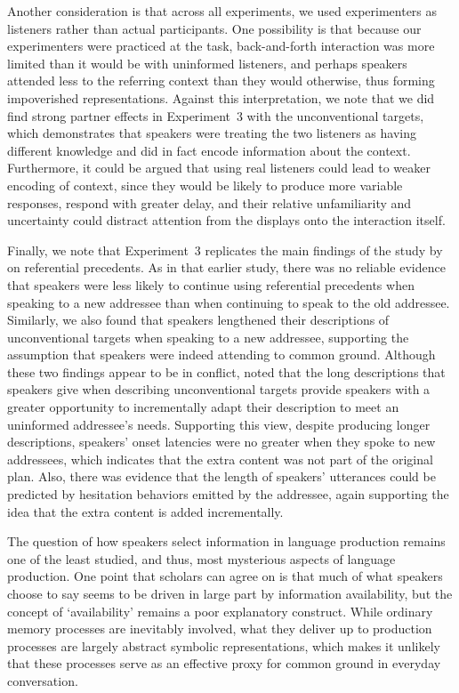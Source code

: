 \documentclass[natbib,man,a4paper]{apa6}
\begin{document}
Another consideration is that across all experiments, we used experimenters as listeners rather than actual participants. One possibility is that because our experimenters were practiced at the task, back-and-forth interaction was more limited than it would be with uninformed listeners, and perhaps speakers attended less to the referring context than they would otherwise, thus forming impoverished representations. Against this interpretation, we note that we did find strong partner effects in Experiment~3 with the unconventional targets, which demonstrates that speakers were treating the two listeners as having different knowledge and did in fact encode information about the context. Furthermore, it could be argued that using real listeners could lead to weaker encoding of context, since they would be likely to produce more variable responses, respond with greater delay, and their relative unfamiliarity and uncertainty could distract attention from the displays onto the interaction itself.

Finally, we note that Experiment~3 replicates the main findings of the study by \cite{GannBarr2014} on referential precedents. As in that earlier study, there was no reliable evidence that speakers were less likely to continue using referential precedents when speaking to a new addressee than when continuing to speak to the old addressee. Similarly, we also found that speakers lengthened their descriptions of unconventional targets when speaking to a new addressee, supporting the assumption that speakers were indeed attending to common ground. Although these two findings appear to be in conflict, \cite{GannBarr2014} noted that the long descriptions that speakers give when describing unconventional targets provide speakers with a greater opportunity to incrementally adapt their description to meet an uninformed addressee's needs. Supporting this view, despite producing longer descriptions, speakers' onset latencies were no greater when they spoke to new addressees, which indicates that the extra content was not part of the original plan. Also, there was evidence that the length of speakers' utterances could be predicted by hesitation behaviors emitted by the addressee, again supporting the idea that the extra content is added incrementally.

The question of how speakers select information in language production remains one of the least studied, and thus, most mysterious aspects of language production. One point that scholars can agree on is that much of what speakers choose to say seems to be driven in large part by information availability, but the concept of `availability' remains a poor explanatory construct. While ordinary memory processes are inevitably involved, what they deliver up to production processes are largely abstract symbolic representations, which makes it unlikely that these processes serve as an effective proxy for common ground in everyday conversation.
\end{document}
